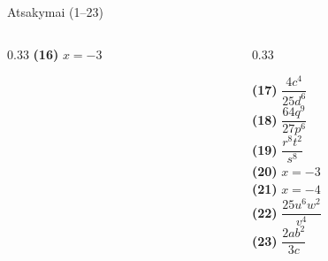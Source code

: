 \documentclass[aspectratio=169,10pt]{beamer}
\begin{document}
\begin{frame}{Atsakymai (1--23)}
\begin{columns}[T]
\begin{column}{0.33\textwidth}
            \textbf{(16)} $x=-3$

        \end{column}

        \begin{column}{0.33\textwidth}

            \small

            \textbf{(17)}
            $\dfrac{4c^4}{25d^6}$ \\[5pt]

            \textbf{(18)}
            $\dfrac{64q^9}{27p^6}$ \\[5pt]

            \textbf{(19)}
            $\dfrac{r^8t^2}{s^8}$ \\[5pt]

            \textbf{(20)} $x=-3$ \\[3pt]

            \textbf{(21)} $x=-4$ \\[3pt]

            \textbf{(22)}
            $\dfrac{25u^6w^2}{v^4}$ \\[5pt]

            \textbf{(23)}
            $\dfrac{2ab^2}{3c}$

        \end{column}

    \end{columns}

\end{frame}
\end{document}
